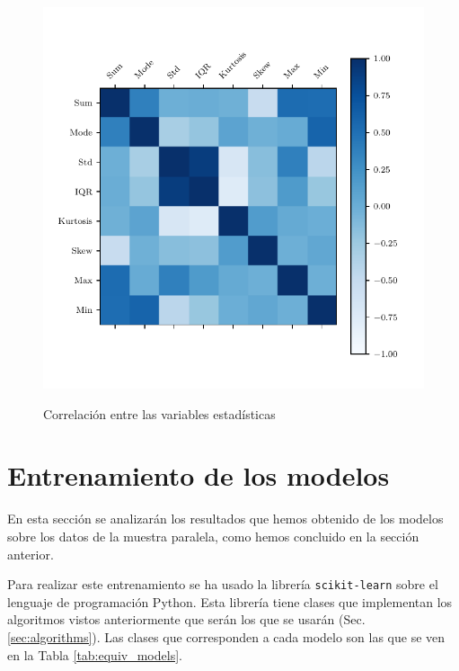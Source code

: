 \begin{figure}
{        \includegraphics[scale=0.55]{../Python/plots/parallel/correlacion_stats_ftred.pdf}
    }
    \caption{Correlación entre las variables estadísticas}
    \label{fig:corr}
\end{figure} 

\section{Entrenamiento de los modelos}

En esta sección se analizarán los resultados que hemos obtenido de los modelos sobre los datos de la muestra paralela, como hemos concluido en la sección anterior.

Para realizar este entrenamiento se ha usado la librería \texttt{scikit-learn} sobre el lenguaje de programación Python. Esta librería tiene clases que implementan los algoritmos vistos anteriormente que serán los que se usarán (Sec. \ref{sec:algorithms}). Las clases que corresponden a cada modelo son las que se ven en la Tabla \ref{tab:equiv_models}.


